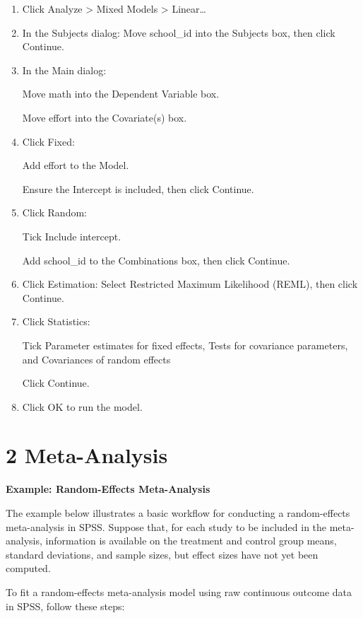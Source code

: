 \documentclass[
  letterpaper,
  DIV=11,
  numbers=noendperiod]{scrreprt}
\begin{document}
\begin{enumerate}
\def\labelenumi{\arabic{enumi}.}
\item
  Click Analyze \textgreater{} Mixed Models \textgreater{}
  Linear\ldots{}
\item
  In the Subjects dialog: Move school\_id into the Subjects box, then
  click Continue.
\item
  In the Main dialog:

  Move math into the Dependent Variable box.

  Move effort into the Covariate(s) box.
\item
  Click Fixed:

  Add effort to the Model.

  Ensure the Intercept is included, then click Continue.
\item
  Click Random:

  Tick Include intercept.

  Add school\_id to the Combinations box, then click Continue.
\item
  Click Estimation: Select Restricted Maximum Likelihood (REML), then
  click Continue.
\item
  Click Statistics:

  Tick Parameter estimates for fixed effects, Tests for covariance
  parameters, and Covariances of random effects

  Click Continue.
\item
  Click OK to run the model.
\end{enumerate}

\section*{2 Meta-Analysis}\label{meta-analysis-1}


\textbf{Example: Random-Effects Meta-Analysis}

The example below illustrates a basic workflow for conducting a
random-effects meta-analysis in SPSS. Suppose that, for each study to be
included in the meta-analysis, information is available on the treatment
and control group means, standard deviations, and sample sizes, but
effect sizes have not yet been computed.

To fit a random-effects meta-analysis model using raw continuous outcome
data in SPSS, follow these steps:
\end{document}
